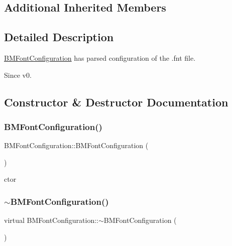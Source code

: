 \subsection*{Additional Inherited Members}


\subsection{Detailed Description}
\hyperlink{classBMFontConfiguration}{B\+M\+Font\+Configuration} has parsed configuration of the .fnt file. 

\begin{DoxySince}{Since}
v0. 
\end{DoxySince}


\subsection{Constructor \& Destructor Documentation}
\mbox{\label{classBMFontConfiguration_ga04b6c1a932298f09e2271950f2da6661}} 
\subsubsection{\texorpdfstring{B\+M\+Font\+Configuration()}{BMFontConfiguration()}}
{\footnotesize\ttfamily B\+M\+Font\+Configuration\+::\+B\+M\+Font\+Configuration (\begin{DoxyParamCaption}{ }\end{DoxyParamCaption})}

ctor \mbox{\label{classBMFontConfiguration_gad54c7b6ca83e8eaaedfff5ec431b8b11}} 
\subsubsection{\texorpdfstring{$\sim$\+B\+M\+Font\+Configuration()}{~BMFontConfiguration()}}
{\footnotesize\ttfamily virtual B\+M\+Font\+Configuration\+::$\sim$\+B\+M\+Font\+Configuration (\begin{DoxyParamCaption}{ }\end{DoxyParamCaption})\hspace{0.3cm}{\ttfamily [virtual]}}

